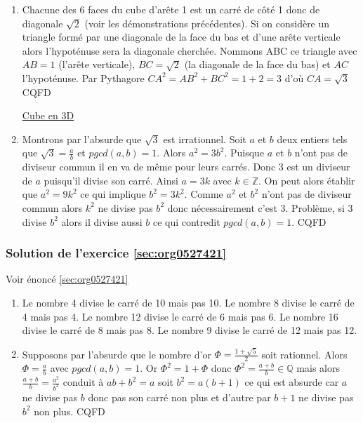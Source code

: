 \documentclass[a4paper, 11pt, twoside]{article}
\newcommand{\E}[1]{\mathbb{#1}}
\begin{document}
\begin{enumerate}
\item Chacune des 6 faces du cube d'arête 1 est un carré de côté 1
donc de diagonale \(\sqrt{2}\) (voir les démonstrations
précédentes). Si on considère un triangle formé par une
diagonale de la face du bas et d'une arête verticale alors
l'hypoténuse sera la diagonale cherchée. Nommons ABC ce
triangle avec \(AB = 1\) (l'arête verticale), \(BC = \sqrt{2}\) (la
diagonale de la face du bas) et \(AC\) l'hypoténuse. Par
Pythagore \(CA^2 = AB^2 + BC^2 = 1 + 2 = 3\) d'où \(CA = \sqrt{3}\)
CQFD

\href{https://drive.google.com/file/d/1IRA1h0fzjiR9aVBPM4pPzKq3\_egsHwVt/view?usp=sharing}{Cube en 3D}

\item Montrons par l'absurde que \(\sqrt{3}\) est irrationnel. Soit \(a\)
et \(b\) deux entiers tels que \(\sqrt{3} = \frac{a}{b}\) et
\(pgcd(a, b) = 1\). Alors \(a^2 = 3b^2\). Puisque \(a\) et \(b\) n'ont
pas de diviseur commun il en va de même pour leurs carrés. Donc
3 est un diviseur de \(a\) puisqu'il divise son carré. Ainsi \(a =
       3k\) avec \(k\in\E{Z}\). On peut alors établir que \(a^2 =
       9k^2\) ce qui implique \(b^2 = 3k^2\). Comme \(a^2\) et \(b^2\) n'ont
pas de diviseur commun alors \(k^2\) ne divise pas \(b^2\) donc
nécessairement c'est 3. Problème, si 3 divise \(b^2\) alors il
divise aussi \(b\) ce qui contredit \(pgcd(a, b) = 1\). CQFD
\end{enumerate}

\subsubsection{Solution de l'exercice \ref{sec:org0527421}}
\label{sec:org0d068b0}
Voir énoncé \ref{sec:org0527421}

\begin{enumerate}
\item Le nombre 4 divise le carré de 10 mais pas 10. Le nombre 8
divise le carré de 4 mais pas 4. Le nombre 12 divise le carré
de 6 mais pas 6. Le nombre 16 divise le carré de 8 mais
pas 8. Le nombre 9 divise le carré de 12 mais pas 12.
\item Supposons par l'absurde que le nombre d'or \(\Phi = \frac{1 +
       \sqrt{5}}{2}\) soit rationnel. Alors \(\Phi = \frac{a}{b}\) avec
\(pgcd(a, b) = 1\). Or \(\Phi^2 = 1 + \Phi\) donc \(\Phi^2 =
       \frac{a + b}{b}\in\E{Q}\) mais alors \(\frac{a + b}{b} =
       \frac{a^2}{b^2}\) conduit à \(ab + b^2 = a\) soit \(b^2 = a(b+1)\)
ce qui est absurde car \(a\) ne divise pas \(b\) donc pas son carré
non plus et d'autre par \(b + 1\) ne divise pas \(b^2\) non plus. CQFD
\end{enumerate}
\stopcontents[level-2]
\stopcontents[level-1]
\end{document}
